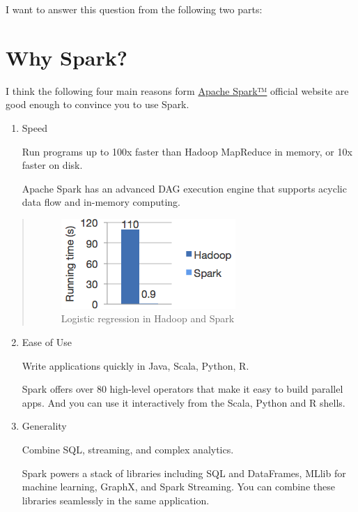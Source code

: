\documentclass[letterpaper,11pt,english]{sphinxmanual}
\begin{document}
I want to answer this question from the following two parts:


\section{Why Spark?}
\label{why:why-spark}
I think the following four main reasons form \href{http://spark.apache.org/}{Apache Spark™} official website are good enough
to convince you to use Spark.
\begin{enumerate}
\item {} 
Speed

Run programs up to 100x faster than Hadoop MapReduce in memory, or 10x faster on disk.

Apache Spark has an advanced DAG execution engine that supports acyclic data flow and in-memory computing.

\end{enumerate}
\begin{quote}
\begin{figure}[htbp]
\centering
\capstart

\includegraphics{logistic-regression.png}
\caption{Logistic regression in Hadoop and Spark}\label{why:fig-lr}\end{figure}
\end{quote}
\begin{enumerate}
\setcounter{enumi}{1}
\item {} 
Ease of Use

Write applications quickly in Java, Scala, Python, R.

Spark offers over 80 high-level operators that make it easy to build parallel apps. And you can use it interactively from the Scala, Python and R shells.

\item {} 
Generality

Combine SQL, streaming, and complex analytics.

Spark powers a stack of libraries including SQL and DataFrames, MLlib for machine learning, GraphX, and Spark Streaming. You can combine these libraries seamlessly in the same application.

\end{enumerate}
\end{document}

